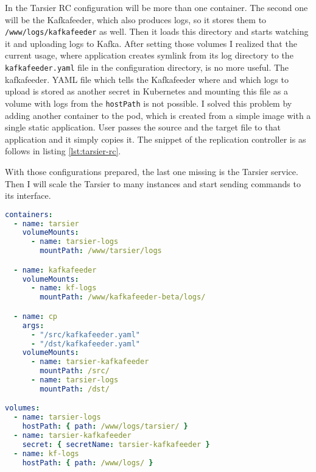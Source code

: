 In the Tarsier RC configuration will be more than one container. The second one will be the Kafkafeeder, which also produces logs, so it stores them to \lstinline{/www/logs/kafkafeeder} as well. Then it loads this directory and starts watching it and uploading logs to Kafka. After setting those volumes I realized that the current usage, where application creates symlink from its log directory to the \lstinline{kafkafeeder.yaml} file in the configuration directory, is no more useful. The kafkafeeder. YAML file which tells the Kafkafeeder where and which logs to upload is stored as another secret in Kubernetes and mounting this file as a volume with logs from the \lstinline{hostPath} is not possible. I solved this problem by adding another container to the pod, which is created from a simple image with a single static application. User passes the source and the target file to that application and it simply copies it. The snippet of the replication controller is as follows in listing \ref{lst:tarsier-rc}.

With those configurations prepared, the last one missing is the Tarsier service. Then I will scale the Tarsier to many instances and start sending commands to its interface.

\newpage
\begin{lstlisting}[language=yaml,caption={Snippet of replication controller configuration},label={lst:tarsier-rc}]
containers:
  - name: tarsier
    volumeMounts:
      - name: tarsier-logs
        mountPath: /www/tarsier/logs

  - name: kafkafeeder
    volumeMounts:
      - name: kf-logs
        mountPath: /www/kafkafeeder-beta/logs/

  - name: cp
    args:
      - "/src/kafkafeeder.yaml"
      - "/dst/kafkafeeder.yaml"
    volumeMounts:
      - name: tarsier-kafkafeeder
        mountPath: /src/
      - name: tarsier-logs
        mountPath: /dst/

volumes:
  - name: tarsier-logs
    hostPath: { path: /www/logs/tarsier/ }
  - name: tarsier-kafkafeeder
    secret: { secretName: tarsier-kafkafeeder }
  - name: kf-logs
    hostPath: { path: /www/logs/ }
\end{lstlisting}
